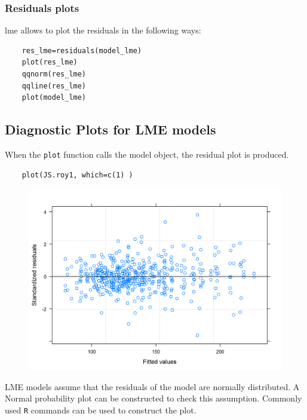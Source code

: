 \documentclass[12pt, a4paper]{report}
\theoremstyle{plain}
\theoremstyle{definition}
\theoremstyle{remark}
\begin{document}

\subsubsection{Residuals plots}

lme allows to plot the residuals in the following ways:

\begin{framed}
	\begin{verbatim}
	res_lme=residuals(model_lme)
	plot(res_lme)
	qqnorm(res_lme)
	qqline(res_lme)
	plot(model_lme)
	\end{verbatim}
\end{framed}



\subsection{Diagnostic Plots for LME models}



When the \texttt{plot} function calls the model object, the residual plot is produced.





\begin{framed}
	\begin{verbatim}
	plot(JS.roy1, which=c(1) )
	\end{verbatim}
\end{framed}


\begin{figure}[h!]
	\centering
	\includegraphics[width=0.9\linewidth]{images/ResidPlot1}
	\caption{}
	\label{fig:ResidPlot1}
\end{figure}
LME models assume that the residuals of the model are normally distributed. A Normal probability plot can be constructed to check this assumption. Commonly used \texttt{R} commands can be used to construct the plot.
\newpage
\end{document}
